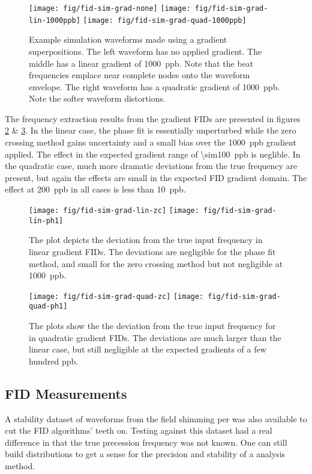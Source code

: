 \begin{figure}
\label{fig:fid-sim-grad}
\centering
\texttt{[image: fig/fid-sim-grad-none]}
\texttt{[image: fig/fid-sim-grad-lin-1000ppb]}
\texttt{[image: fig/fid-sim-grad-quad-1000ppb]}
\caption{Example simulation waveforms made using a gradient superpositions.  The left waveform has no applied gradient.  The middle has a linear gradient of \SI{1000}{ppb}.  Note that the beat frequencies emplace near complete nodes onto the waveform envelope.  The right waveform has a quadratic gradient of \SI{1000}{ppb}.  Note the softer waveform distortions.}
\end{figure}

The frequency extraction results from the gradient FIDs are presented in figures \ref{fig:fid-sim-grad-lin-results} \& \ref{fig:fid-sim-grad-quad-results}.  In the linear case, the phase fit is essentially unperturbed while the zero crossing method gains uncertainty and a small bias over the \SI{1000}{ppb} gradient applied.  The effect in the expected gradient range of \SI{\sim100}{ppb} is neglible.  In the quadratic case, much more dramatic deviations from the true frequency are present, but again the effects are small in the expected FID gradient domain.  The effect at \SI{200}{ppb} in all cases is less than \SI{10}{ppb}.

\begin{figure}
\label{fig:fid-sim-grad-lin-results}
\centering
\texttt{[image: fig/fid-sim-grad-lin-zc]}
\texttt{[image: fig/fid-sim-grad-lin-ph1]}
\caption{The plot depicts the deviation from the true input frequency in linear gradient FIDs.  The deviations are negligible for the phase fit method, and small for the zero crossing method but not negligible at \SI{1000}{ppb}.} 
\end{figure}

\begin{figure}
\label{fig:fid-sim-grad-quad-results}
\centering
\texttt{[image: fig/fid-sim-grad-quad-zc]}
\texttt{[image: fig/fid-sim-grad-quad-ph1]}
\caption{The plots show the the deviation from the true input frequency for in quadratic gradient FIDs.  The deviations are much larger than the linear case, but still negligible at the expected gradients of a few hundred ppb.}
\end{figure}

\subsection{FID Measurements}
A stability dataset of waveforms from the field shimming per was also available to cut the FID algorithms' teeth on.  Testing against this dataset had a real difference in that the true precession frequency was not known.  One can still build distributions to get a sense for the precision and stability of a analysis method.

